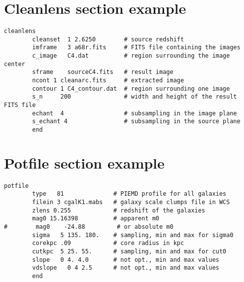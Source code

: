 \section{Cleanlens section example}
\begin{verbatim}
cleanlens
        cleanset  1 2.6250        # source redshift
        imframe   3 a68r.fits     # FITS file containing the images
        c_image   C4.dat          # region surrounding the image center
        sframe    sourceC4.fits   # result image
        ncont 1 cleanarc.fits     # extracted image
        contour 1 C4_contour.dat  # region surrounding one image
        s_n     200               # width and height of the result FITS file
        echant  4                 # subsampling in the image plane
        s_echant 4                # subsampling in the source plane
        end
\end{verbatim}

\section{Potfile section example}
\begin{verbatim}
potfile
        type   81              # PIEMD profile for all galaxies
        filein 3 cgalK1.mabs   # galaxy scale clumps file in WCS
        zlens 0.255            # redshift of the galaxies
        mag0 15.16398          # apparent m0
#        mag0    -24.88         # or absolute m0
        sigma   5 135. 180.    # sampling, min and max for sigma0
        corekpc .09            # core radius in kpc
        cutkpc  5 25. 55.      # sampling, min and max for cut0   
        slope   0 4. 4.0       # not opt., min and max values
        vdslope   0 4 2.5      # not opt., min and max values
        end
\end{verbatim}
